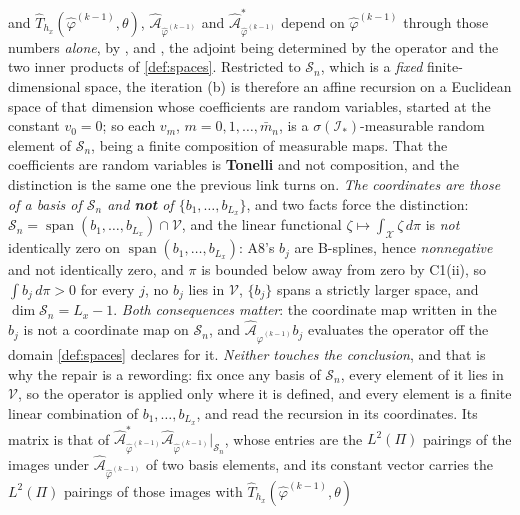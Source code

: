 \begin{enumerate}
and $\hat T_{h_x}(\hat\varphi^{(k-1)},\theta)$, $\hat{\mathcal A}_{\hat\varphi^{(k-1)}}$ and
$\hat{\mathcal A}^\ast_{\hat\varphi^{(k-1)}}$ depend on $\hat\varphi^{(k-1)}$ through those numbers
\emph{alone}, by ,  and , the adjoint being determined by the
operator and the two inner products of \cref{def:spaces}. Restricted to $\mathcal S_n$, which
is a \emph{fixed} finite-dimensional space, the iteration \textup{(b)} is therefore an affine recursion on
a Euclidean space of that dimension whose coefficients are random variables, started at the constant
$v_0=0$; so each
$v_m$, $m=0,1,\dots,\bar m_n$, is a $\sigma(\mathcal I_\ast)$-measurable random element of $\mathcal S_n$, being a
finite composition of measurable maps. That the coefficients are random variables is
\textbf{Tonelli} and not composition, and the distinction is the same one the previous link turns on.
\emph{The coordinates are those of a basis of $\mathcal S_n$ and \textbf{not} of $\{b_1,\dots,b_{L_x}\}$},
and two facts force the distinction:
$\mathcal S_n=\operatorname{span}(b_1,\dots,b_{L_x})\cap\mathcal V$, and the linear functional
$\zeta\mapsto\int_{\mathcal X}\zeta\,d\pi$ is \emph{not} identically zero on
$\operatorname{span}(b_1,\dots,b_{L_x})$: A8's $b_j$ are B-splines, hence \emph{nonnegative} and not
identically zero, and $\pi$ is bounded below away from zero by C1(ii), so
$\int b_j\,d\pi>0$ for every $j$, no $b_j$ lies in $\mathcal V$, $\{b_j\}$ spans a strictly larger space, and
$\dim\mathcal S_n=L_x-1$. \emph{Both consequences matter}: the coordinate map written in the $b_j$ is not a
coordinate map on $\mathcal S_n$, and $\hat{\mathcal A}_{\hat\varphi^{(k-1)}}b_j$ evaluates the operator off
the domain \cref{def:spaces} declares for it. \emph{Neither touches the conclusion}, and that is why the
repair is a rewording: fix once any basis of $\mathcal S_n$, every element of it lies in $\mathcal V$, so
the operator is applied only where it is defined, and every element is a finite linear combination of
$b_1,\dots,b_{L_x}$, and read the recursion in its coordinates. Its matrix is that of
$\hat{\mathcal A}^\ast_{\hat\varphi^{(k-1)}}\hat{\mathcal A}_{\hat\varphi^{(k-1)}}\vert_{\mathcal S_n}$,
whose entries are the $L^{2}(\Pi)$ pairings of the images under
$\hat{\mathcal A}_{\hat\varphi^{(k-1)}}$ of two basis elements, and its constant vector carries the
$L^{2}(\Pi)$ pairings of those images with $\hat T_{h_x}(\hat\varphi^{(k-1)},\theta)$

\end{enumerate}

